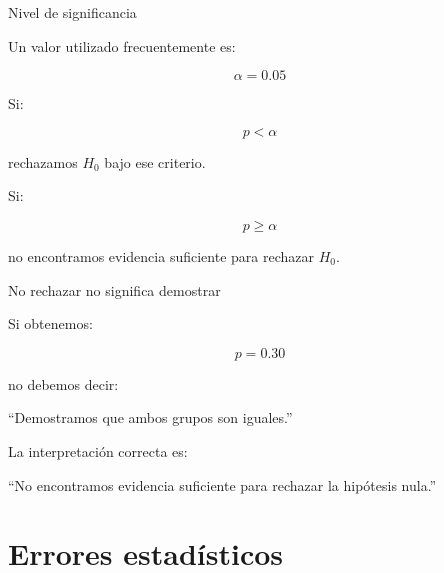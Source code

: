 \documentclass[aspectratio=169,11pt]{beamer}
\begin{document}

\begin{frame}{Nivel de significancia}

Un valor utilizado frecuentemente es:

\[
\alpha
=
0.05
\]

Si:

\[
p < \alpha
\]

rechazamos $H_0$ bajo ese criterio.

Si:

\[
p \geq \alpha
\]

no encontramos evidencia suficiente para rechazar $H_0$.

\end{frame}


\begin{frame}{No rechazar no significa demostrar}

Si obtenemos:

\[
p = 0.30
\]

no debemos decir:

\begin{center}

``Demostramos que ambos grupos son iguales.''
\end{center}

\vspace{0.4cm}

La interpretación correcta es:

\begin{center}

``No encontramos evidencia suficiente para rechazar la hipótesis nula.''
\end{center}

\end{frame}

\section{Errores estadísticos}
\end{document}
